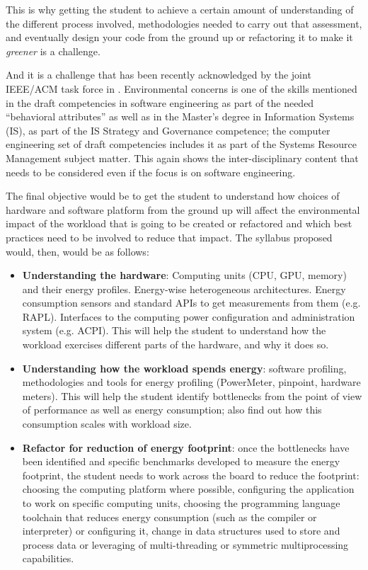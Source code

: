 \documentclass[sigconf]{acmart}
\begin{document}
This is why getting the student to achieve a certain amount of understanding of
the different process involved, methodologies needed to carry out that
assessment, and eventually design your code from the ground up or refactoring it
to make it {\em greener} is a challenge.

And it is a challenge that has been recently acknowledged by the joint IEEE/ACM
task force in \cite{cc2020}. Environmental concerns is one of the skills
mentioned in the draft competencies in software engineering as part of the
needed ``behavioral attributes'' as well as in the
Master's degree in Information Systems (IS), as part of the IS Strategy and
Governance competence; the computer engineering set of draft competencies
includes it as part of the Systems Resource Management subject matter. This
again shows the inter-disciplinary content that needs to be considered even if
the focus is on software engineering.

The final objective would be to get the student to understand how choices of
hardware and software platform from the ground up will affect the environmental
impact of the workload that is going to be created or refactored and which best
practices need to be involved to reduce that impact. The syllabus proposed
would, then, would be as follows:\begin{itemize}
\item {\bf Understanding the hardware}: Computing units (CPU, GPU, memory) and their energy profiles. Energy-wise
  heterogeneous architectures. Energy consumption sensors and
  standard APIs to get measurements from them (e.g. RAPL). Interfaces to the
  computing power configuration and administration system (e.g. ACPI). This will
  help the student to understand how the workload exercises different parts of
  the hardware, and why it does so.
\item {\bf Understanding how the workload spends energy}: software profiling,
  methodologies and tools for energy profiling (PowerMeter, {\sf pinpoint}, hardware meters). This will help the student identify
  bottlenecks from the point of view of performance as well as energy
  consumption; also find out how this consumption scales with workload size.
\item {\bf Refactor for reduction of energy footprint}: once the bottlenecks
  have been identified and specific benchmarks developed to measure the energy
  footprint, the student needs to work across the board to reduce the footprint:
  choosing the computing platform where possible, configuring the application to
  work on specific computing units, choosing the programming language toolchain
  that reduces energy consumption (such as the compiler or interpreter) or
  configuring it, change
  in data structures used to store and process data or leveraging of
  multi-threading or symmetric multiprocessing capabilities.
\end{itemize}
\end{document}
